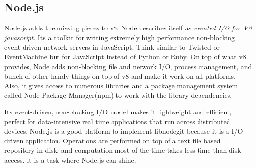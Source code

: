 \subsection{Node.js }

Node.js adds the missing pieces to v8. Node describes itself as \textit{evented
  I/O for V8 javascript}. Its a toolkit for writing extremely high performance
non-blocking event driven network servers in JavaScript. Think similar to
Twisted\cite{twisted} or EventMachine\cite{eventmachine} but for JavaScript
instead of Python or Ruby. On top of what v8 provides, Node adds non-blocking
file and network I/O, process management, and bunch of other handy things on top
of v8 and make it work on all platforms. Also, it gives access to numerous
libraries and a package management system called Node Package
Manager(npm)\cite{npm} to work with the library dependencies.

Its event-driven, non-blocking I/O model makes it lightweight and efficient,
perfect for data-intensive real time applications that run across distributed
devices. Node.js is a good platform to implement libnodegit because it is a I/O
driven application. Operations are performed on top of a text file based
repository in disk, and computation most of the time takes less time than disk
access. It is a task where Node.js can shine.

